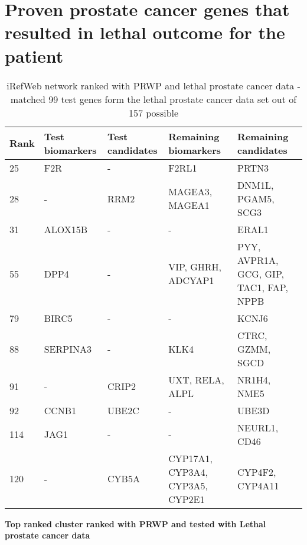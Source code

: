 \section{Proven prostate cancer genes that resulted in lethal outcome for the patient}
\begin{sidewaystable}
    \begin{tabular}{|l|l|l|l|l|}
        \hline
        \textbf{Rank}
        & \textbf{Test biomarkers}
        & \textbf{Test candidates}
        & \textbf{Remaining biomarkers}
        & \textbf{Remaining candidates} \\
        \hline
        25	& F2R	& -	& F2RL1	& PRTN3 \\
        \hline
        28	& -	& RRM2	& MAGEA3, MAGEA1	& DNM1L, PGAM5, SCG3 \\
        \hline
        31	& ALOX15B	& -	& -	& ERAL1 \\
        \hline
        55	& DPP4	& -	& VIP, GHRH, ADCYAP1	& PYY, AVPR1A, GCG, GIP, TAC1, FAP, NPPB \\
        \hline
        79	& BIRC5	& -	& -	& KCNJ6 \\
        \hline
        88	& SERPINA3	& -	& KLK4	& CTRC, GZMM, SGCD \\
        \hline
        91	& -	& CRIP2	& UXT, RELA, ALPL	& NR1H4, NME5 \\
        \hline
        92	& CCNB1	& UBE2C	& -	& UBE3D \\
        \hline
        114	& JAG1	& -	& -	& NEURL1, CD46 \\
        \hline
        120	& -	& CYB5A	& CYP17A1, CYP3A4, CYP3A5, CYP2E1	& CYP4F2, CYP4A11 \\
        \hline
    \end{tabular}
    \caption{iRefWeb network ranked with PRWP and lethal prostate cancer data
    - matched 99 test genes form the lethal prostate cancer data set out of 157
possible}
    \label{tab:prwp-lethal}
\end{sidewaystable}

\textbf{Top ranked cluster ranked with PRWP and tested with Lethal prostate cancer data}

